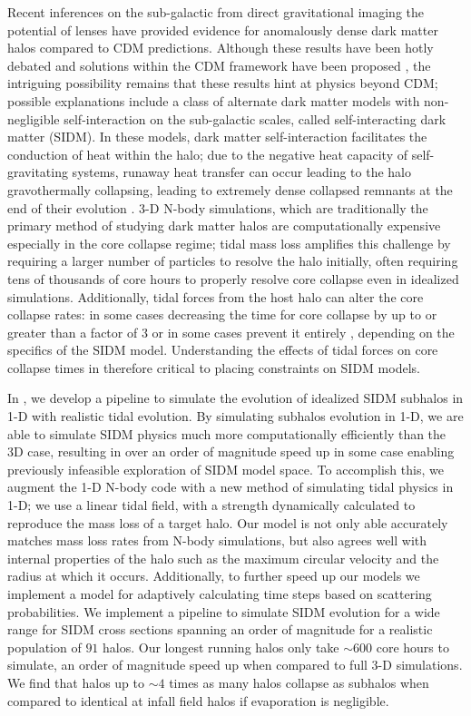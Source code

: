  Recent inferences on the sub-galactic from direct gravitational imaging the potential of lenses \cite{vegetti2010detection, minor2021unexpected, tajalli2025sharp} have provided evidence for anomalously dense dark matter halos compared to CDM predictions.
 Although these results have been hotly debated and solutions within the CDM framework have been proposed \cite{he2025not}, the intriguing possibility remains that these results hint at physics beyond CDM; possible explanations include a class of alternate dark matter models with non-negligible self-interaction on the sub-galactic scales, called self-interacting dark matter (SIDM).
 In these models, dark matter self-interaction facilitates the conduction of heat within the halo; due to the negative heat capacity of self-gravitating systems, runaway heat transfer can occur leading to the halo gravothermally collapsing, leading to extremely dense collapsed remnants at the end of their evolution \cite{tulin2018dark,adhikari2025astrophysical}.
 3-D N-body simulations, which are traditionally the primary method of studying dark matter halos are computationally expensive especially in the core collapse regime; tidal mass loss amplifies this challenge by requiring a larger number of particles to resolve the halo initially, often requiring tens of thousands of core hours to properly resolve core collapse  even in idealized simulations. 
 Additionally, tidal forces from the host halo can alter the core collapse rates: in some cases decreasing the time for core collapse by up to or greater than a factor of $3$ \cite{nishikawa2020accelerated} or in some cases prevent it entirely \cite{zeng2022core}, depending on the specifics of the SIDM model.
 Understanding the effects of tidal forces on core collapse times in therefore critical to placing constraints on SIDM models. 
 
 In , we develop a pipeline to simulate the evolution of idealized SIDM subhalos in 1-D with realistic tidal evolution. 
 By simulating subhalos evolution in 1-D, we are able to simulate SIDM physics much more computationally efficiently than the 3D case, resulting in over an order of magnitude speed up in some case enabling previously infeasible exploration of SIDM model space. 
 To accomplish this, we augment the 1-D N-body code \nsphere \cite{kamionkowski2026numerical, kamionkowski2026evolution} with a new method of simulating tidal physics in 1-D; we use a linear tidal field, with a strength dynamically calculated to reproduce the mass loss of a target halo. 
 Our model is not only able accurately matches mass loss rates from N-body simulations, but also agrees well with internal properties of the halo such as the maximum circular velocity and the radius at which it occurs.
 Additionally, to further speed up our models we implement a model for adaptively calculating time steps based on scattering probabilities. 
 We implement a pipeline to simulate SIDM evolution for a wide range for SIDM cross sections spanning an order of magnitude for a realistic population of $91$ halos.
 Our longest running halos only take $\sim 600$ core hours to simulate, an order of magnitude speed up when compared to full 3-D simulations. 
 We find that halos up to $\sim 4$ times as many halos collapse as subhalos when compared to identical at infall field halos if evaporation is negligible. 
